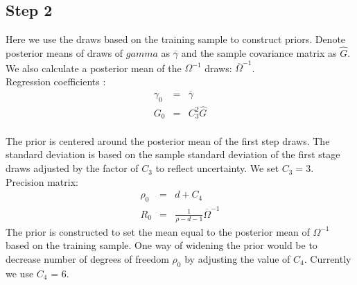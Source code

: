 \documentclass[12pt]{article}
\begin{document}
\subsection{Step 2}
Here we use the draws based on the training sample to construct priors. Denote posterior means of draws of $gamma$ as $\overline{\gamma}$ and the sample covariance matrix as $\widehat{G}$. We also calculate a posterior mean of the $\Omega^{-1}$ draws: $\overline{\Omega}^{-1}$.\\
Regression coefficients :
\begin{eqnarray*}
	\gamma_{0} &=& \overline{\gamma} \\ 
	G_{0} &=& C_{3}^{2} \widehat{G}
\end{eqnarray*}\\
The prior is centered around the posterior mean of the first step draws. The standard deviation is based on the sample standard deviation of the first stage draws adjusted by the factor of $C_{3}$ to reflect uncertainty. We set $C_{3} = 3$.\\
Precision matrix:
\begin{eqnarray*}
	\rho_{0} &=& d + C_{4} \\ 
	R_{0} &=& \frac{1}{\rho - d - 1} \overline{\Omega}^{-1}
\end{eqnarray*}
The prior is constructed to set the mean equal to the posterior mean of $\Omega^{-1}$ based on the training sample. One way of widening the prior would be to decrease number of degrees of freedom $\rho_{0}$ by adjusting the value of $C_4$. Currently we use $C_4$ = 6.
\end{document}
